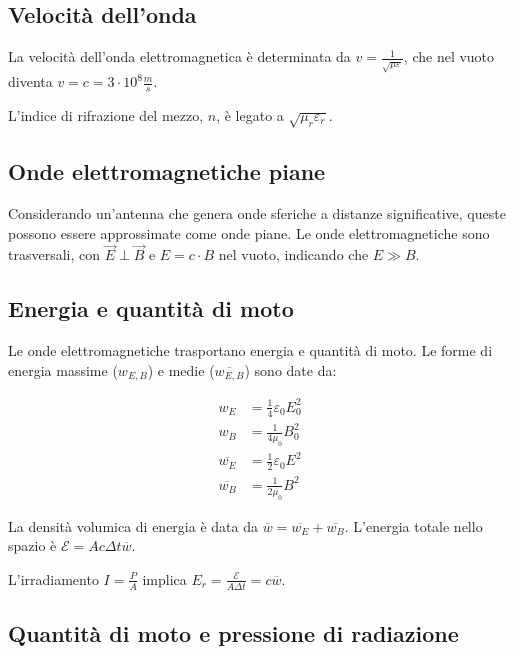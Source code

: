 \subsection{Velocità dell'onda}

La velocità dell'onda elettromagnetica è determinata da $v = \frac{1}{\sqrt{\mu \varepsilon}}$, che nel vuoto diventa $v = c = 3 \cdot 10^8 \frac{m}{s}$.

L'indice di rifrazione del mezzo, $n$, è legato a $\sqrt{\mu_r \varepsilon_r}$.

\subsection{Onde elettromagnetiche piane}

Considerando un'antenna che genera onde sferiche a distanze significative, queste possono essere approssimate come onde piane. Le onde elettromagnetiche sono trasversali, con $\vec{E} \perp \vec{B}$ e $E = c \cdot B$ nel vuoto, indicando che $E \gg B$.

\subsection{Energia e quantità di moto}

Le onde elettromagnetiche trasportano energia e quantità di moto. Le forme di energia massime ($w_{E,B}$) e medie ($\overline{w_{E,B}}$) sono date da:

\begin{align*}
    w_E            & = \frac{1}{4} \varepsilon_0 E_0^2 \\
    w_B            & = \frac{1}{4 \mu_0} B_0^2         \\
    \overline{w_E} & = \frac{1}{2} \varepsilon_0 E^2   \\
    \overline{w_B} & = \frac{1}{2 \mu_0} B^2
\end{align*}

La densità volumica di energia è data da $\overline{w} = \overline{w_E} + \overline{w_B}$. L'energia totale nello spazio è $\mathcal{E} = A c \Delta t \overline{w}$.

L'irradiamento $I = \frac{P}{A}$ implica $E_r = \frac{\mathcal{E}}{A \Delta t} = c \overline{w}$.

\subsection{Quantità di moto e pressione di radiazione}

